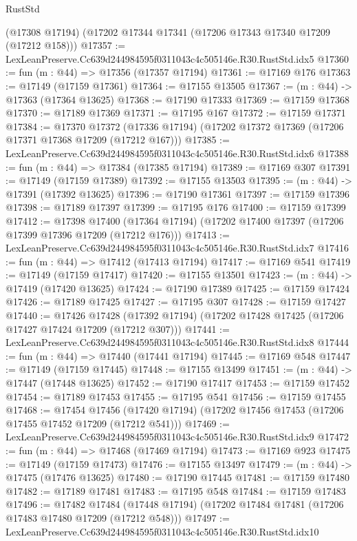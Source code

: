 \begin{lexlean}{RustStd}
\begin{coremodule}
    (@17308 @17194)
    (@17202 @17344 @17341 (@17206 @17343 @17340 @17209 (@17212 @158)))
@17357 := LexLeanPreserve.Cc639d244984595f0311043c4c505146e.R30.RustStd.idx5
@17360 := fun (m : @44) => @17356 (@17357 @17194)
@17361 := @17169 @176
@17363 := @17149 (@17159 @17361)
@17364 := @17155 @13505
@17367 := (m : @44) -> @17363 (@17364 @13625)
@17368 := @17190 @17333
@17369 := @17159 @17368
@17370 := @17189 @17369
@17371 := @17195 @167
@17372 := @17159 @17371
@17384 := @17370
    @17372
    (@17336 @17194)
    (@17202 @17372 @17369 (@17206 @17371 @17368 @17209 (@17212 @167)))
@17385 := LexLeanPreserve.Cc639d244984595f0311043c4c505146e.R30.RustStd.idx6
@17388 := fun (m : @44) => @17384 (@17385 @17194)
@17389 := @17169 @307
@17391 := @17149 (@17159 @17389)
@17392 := @17155 @13503
@17395 := (m : @44) -> @17391 (@17392 @13625)
@17396 := @17190 @17361
@17397 := @17159 @17396
@17398 := @17189 @17397
@17399 := @17195 @176
@17400 := @17159 @17399
@17412 := @17398
    @17400
    (@17364 @17194)
    (@17202 @17400 @17397 (@17206 @17399 @17396 @17209 (@17212 @176)))
@17413 := LexLeanPreserve.Cc639d244984595f0311043c4c505146e.R30.RustStd.idx7
@17416 := fun (m : @44) => @17412 (@17413 @17194)
@17417 := @17169 @541
@17419 := @17149 (@17159 @17417)
@17420 := @17155 @13501
@17423 := (m : @44) -> @17419 (@17420 @13625)
@17424 := @17190 @17389
@17425 := @17159 @17424
@17426 := @17189 @17425
@17427 := @17195 @307
@17428 := @17159 @17427
@17440 := @17426
    @17428
    (@17392 @17194)
    (@17202 @17428 @17425 (@17206 @17427 @17424 @17209 (@17212 @307)))
@17441 := LexLeanPreserve.Cc639d244984595f0311043c4c505146e.R30.RustStd.idx8
@17444 := fun (m : @44) => @17440 (@17441 @17194)
@17445 := @17169 @548
@17447 := @17149 (@17159 @17445)
@17448 := @17155 @13499
@17451 := (m : @44) -> @17447 (@17448 @13625)
@17452 := @17190 @17417
@17453 := @17159 @17452
@17454 := @17189 @17453
@17455 := @17195 @541
@17456 := @17159 @17455
@17468 := @17454
    @17456
    (@17420 @17194)
    (@17202 @17456 @17453 (@17206 @17455 @17452 @17209 (@17212 @541)))
@17469 := LexLeanPreserve.Cc639d244984595f0311043c4c505146e.R30.RustStd.idx9
@17472 := fun (m : @44) => @17468 (@17469 @17194)
@17473 := @17169 @923
@17475 := @17149 (@17159 @17473)
@17476 := @17155 @13497
@17479 := (m : @44) -> @17475 (@17476 @13625)
@17480 := @17190 @17445
@17481 := @17159 @17480
@17482 := @17189 @17481
@17483 := @17195 @548
@17484 := @17159 @17483
@17496 := @17482
    @17484
    (@17448 @17194)
    (@17202 @17484 @17481 (@17206 @17483 @17480 @17209 (@17212 @548)))
@17497 := LexLeanPreserve.Cc639d244984595f0311043c4c505146e.R30.RustStd.idx10

\end{coremodule}
\end{lexlean}
